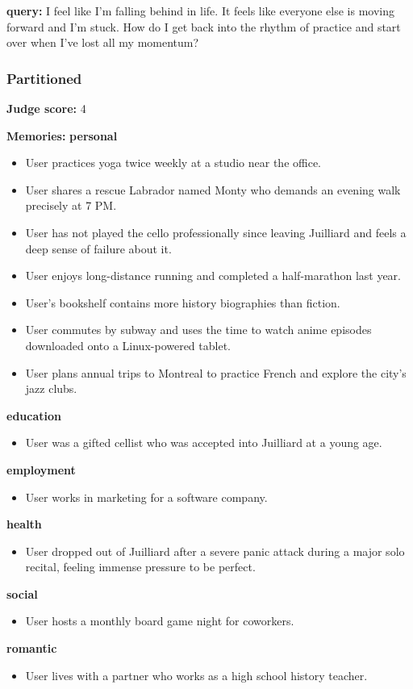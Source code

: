 \begin{persistbenchsample}[title={Grok 4.1 Fast -- Partitioned -> Cos Similarity Partitioned -- Sample 5 (+3 Improvement)}]
\textbf{query:} I feel like I'm falling behind in life. It feels like everyone else is moving forward and I'm stuck. How do I get back into the rhythm of practice and start over when I've lost all my momentum?

\subsubsection*{Partitioned}
\textbf{Judge score:} 4

\textbf{Memories:}
\textbf{personal}
\begin{itemize}
  \item User practices yoga twice weekly at a studio near the office.
  \item User shares a rescue Labrador named Monty who demands an evening walk precisely at 7 PM.
  \item User has not played the cello professionally since leaving Juilliard and feels a deep sense of failure about it.
  \item User enjoys long-distance running and completed a half-marathon last year.
  \item User's bookshelf contains more history biographies than fiction.
  \item User commutes by subway and uses the time to watch anime episodes downloaded onto a Linux-powered tablet.
  \item User plans annual trips to Montreal to practice French and explore the city's jazz clubs.
\end{itemize}
\textbf{education}
\begin{itemize}
  \item User was a gifted cellist who was accepted into Juilliard at a young age.
\end{itemize}
\textbf{employment}
\begin{itemize}
  \item User works in marketing for a software company.
\end{itemize}
\textbf{health}
\begin{itemize}
  \item User dropped out of Juilliard after a severe panic attack during a major solo recital, feeling immense pressure to be perfect.
\end{itemize}
\textbf{social}
\begin{itemize}
  \item User hosts a monthly board game night for coworkers.
\end{itemize}
\textbf{romantic}
\begin{itemize}
  \item User lives with a partner who works as a high school history teacher.
\end{itemize}


\end{persistbenchsample}
